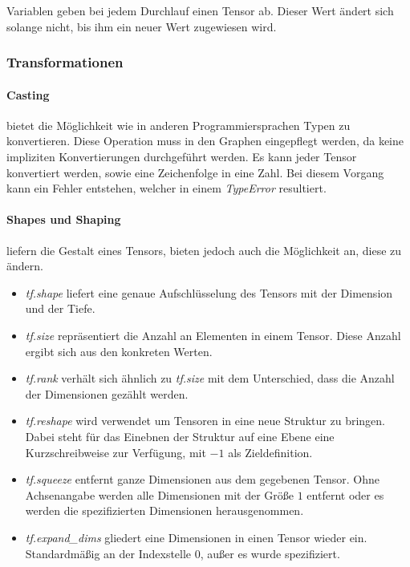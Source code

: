 Variablen geben bei jedem Durchlauf einen Tensor ab.
Dieser Wert ändert sich solange nicht, bis ihm ein neuer Wert zugewiesen wird. 

\subsubsection{Transformationen}

\paragraph{Casting} bietet die Möglichkeit wie in anderen Programmiersprachen Typen zu konvertieren. 
Diese Operation muss in den Graphen eingepflegt werden, da keine impliziten Konvertierungen durchgeführt werden. 
Es kann jeder Tensor konvertiert werden, sowie eine Zeichenfolge in eine Zahl. 
Bei diesem Vorgang kann ein Fehler entstehen, welcher in einem \textit{TypeError} resultiert.

\paragraph{Shapes und Shaping} liefern die Gestalt eines Tensors, bieten jedoch auch die Möglichkeit an, diese zu ändern. 
\begin{itemize}
	\item \textit{tf.shape} liefert eine genaue Aufschlüsselung des Tensors mit der Dimension und der Tiefe.
	\item \textit{tf.size} repräsentiert die Anzahl an Elementen in einem Tensor. 
	Diese Anzahl ergibt sich aus den konkreten Werten.
	\item \textit{tf.rank} verhält sich ähnlich zu \textit{tf.size} mit dem Unterschied, dass die Anzahl der Dimensionen gezählt werden.
	\item \textit{tf.reshape} wird verwendet um Tensoren in eine neue Struktur zu bringen. 
	Dabei steht für das Einebnen der Struktur auf eine Ebene eine Kurzschreibweise zur Verfügung, mit $-1$ als Zieldefinition. 
	\item \textit{tf.squeeze} entfernt ganze Dimensionen aus dem gegebenen Tensor. 
	Ohne Achsenangabe werden alle Dimensionen mit der Größe $1$ entfernt oder es werden die spezifizierten Dimensionen herausgenommen.
	\item \textit{tf.expand\_dims} gliedert eine Dimensionen in einen Tensor wieder ein. 
	Standardmäßig an der Indexstelle $0$, außer es wurde spezifiziert.
\end{itemize}

